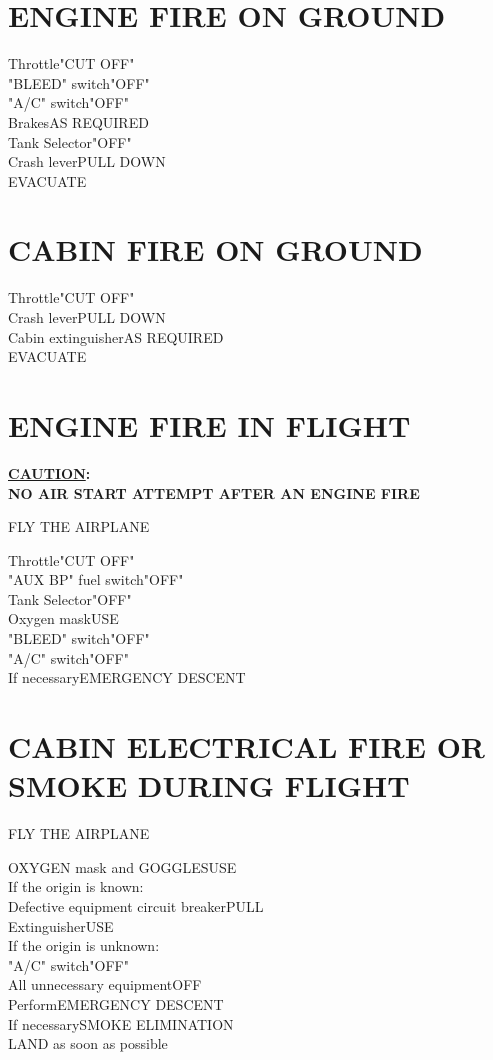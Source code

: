 \documentclass{article}
\newcommand{\fly}{\vspace{-1em}\begin{center}\color{Green}FLY THE AIRPLANE\end{center}\vspace{-1em}}
\begin{document}
\begin{multicols*}{2}
\section*{ENGINE FIRE ON GROUND}
Throttle\dotfill "CUT OFF"\\
"BLEED" switch\dotfill "OFF"\\
"A/C" switch\dotfill "OFF"\\
Brakes\dotfill AS REQUIRED\\
Tank Selector\dotfill "OFF"\\
Crash lever\dotfill PULL DOWN\\
EVACUATE
\section*{CABIN FIRE ON GROUND}
Throttle\dotfill "CUT OFF"\\
Crash lever\dotfill PULL DOWN\\
Cabin extinguisher\dotfill AS REQUIRED\\
EVACUATE
\section*{ENGINE FIRE IN FLIGHT}
\textbf{\underline{CAUTION}: \\NO AIR START ATTEMPT AFTER AN ENGINE FIRE}
\fly
Throttle\dotfill "CUT OFF"\\
"AUX BP" fuel switch\dotfill "OFF"\\
Tank Selector\dotfill "OFF"\\
Oxygen mask\dotfill USE\\
"BLEED" switch\dotfill "OFF"\\
"A/C" switch\dotfill "OFF"\\
If necessary\dotfill EMERGENCY DESCENT
\section*{CABIN ELECTRICAL FIRE OR SMOKE DURING FLIGHT}
\vspace{1em}
\fly
OXYGEN mask and GOGGLES\dotfill USE\\
If the origin is known:\\
Defective equipment circuit breaker\dotfill PULL\\
Extinguisher\dotfill USE\\
If the origin is unknown:\\
"A/C" switch\dotfill "OFF"\\
All unnecessary equipment\dotfill OFF\\
Perform\dotfill EMERGENCY DESCENT\\
If necessary\dotfill SMOKE ELIMINATION\\
LAND as soon as possible
\vfill\null

\end{multicols*}
\end{document}
